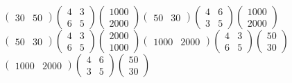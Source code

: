 \begin{choicesv}{$\begin{pmatrix} 30 & 50 \end{pmatrix}\begin{pmatrix} 4 & 3 \\ 6 & 5 \end{pmatrix}\begin{pmatrix} 1000 \\ 2000 \end{pmatrix}$}{$\begin{pmatrix} 50 & 30 \end{pmatrix}\begin{pmatrix} 4 & 6 \\ 3 & 5 \end{pmatrix}\begin{pmatrix} 1000 \\ 2000 \end{pmatrix}$}{$\begin{pmatrix} 50 & 30 \end{pmatrix}\begin{pmatrix} 4 & 3 \\ 6 & 5 \end{pmatrix}\begin{pmatrix} 2000 \\ 1000 \end{pmatrix}$}{$\begin{pmatrix} 1000 & 2000 \end{pmatrix}\begin{pmatrix} 4 & 3 \\ 6 & 5 \end{pmatrix}\begin{pmatrix} 50 \\ 30 \end{pmatrix}$}{$\begin{pmatrix} 1000 & 2000 \end{pmatrix}\begin{pmatrix} 4 & 6 \\ 3 & 5 \end{pmatrix}\begin{pmatrix} 50 \\ 30 \end{pmatrix}$}\end{choicesv}
